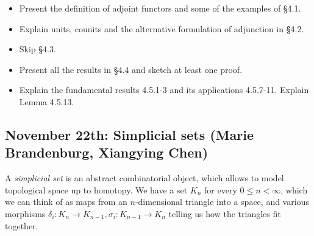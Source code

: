 \documentclass{amsart}
\theoremstyle{definition}
\theoremstyle{remark}
\begin{document}
\begin{itemize}
\item Present the definition of adjoint functors and some of the examples of \S 4.1.
\item Explain units, counits and the alternative formulation of adjunction in \S 4.2.
\item Skip \S 4.3.
\item Present all the results in \S 4.4 and sketch at least one proof.
\item Explain the fundamental results 4.5.1-3 and its applications 4.5.7-11. Explain Lemma 4.5.13.
\end{itemize}

\subsection{November 22th: Simplicial sets (Marie Brandenburg, Xiangying Chen)}

A \emph{simplicial set} is an abstract combinatorial object, which allows to model topological space up to homotopy. We have a set $K_n$ for every $0 \leq n < \infty$, which we can think of as maps from an $n$-dimensional triangle into a space, and various morphisms $\delta_i: K_n \to K_{n-1}, \sigma_i: K_{n-1} \to K_n$ telling us how the triangles fit together.
\end{document}
